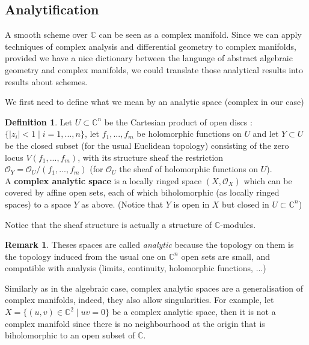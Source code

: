 \documentclass{article}
\theoremstyle{plain}
\theoremstyle{definition}
\newtheorem{definition}[theorem]{Definition}
\newtheorem{remark}{Remark}
\begin{document}
\subsection{Analytification}
\label{analytification}

A smooth scheme over $\mathbb{C}$ can be seen as a complex manifold. 
Since we can apply techniques of complex analysis and differential geometry to complex manifolds, 
provided we have a nice dictionary between the language of abstract algebraic geometry and complex
manifolds, we could translate those analytical results into results about schemes.

\noindent We first need to define what we mean by an analytic space (complex in our case) 

\begin{definition}

    Let $U\subset \mathbb{C}^n$ be the Cartesian product of open discs : $\{|z_i| <1 \mid i=1,...,n\}$,
    let $f_1,...,f_m$ be holomorphic functions on $U$ and
    let $Y\subset U$ be the closed subset (for the usual Euclidean topology) consisting of the zero locus $V(f_1,...,f_m)$, 
    with its structure sheaf the restriction $\mathcal{O}_Y = \mathcal{O}_U/(f_1,...,f_m)$ (for $\mathcal{O}_U$ the sheaf of holomorphic functions on $U$).\\
    A \textbf{complex analytic space} is a locally ringed space $(X,\mathcal{O}_X)$ which can be covered by affine open sets, each of which biholomorphic (as locally ringed spaces) to a space $Y$ as above. (Notice that $Y$ is open in $X$ but closed in $U\subset \mathbb{C}^n$)
\end{definition}

\noindent Notice that the sheaf structure is actually a structure of $\mathbb{C}$-modules.

\begin{remark}
    Theses spaces are called \textit{analytic} because the topology on them is the topology induced from the usual one on $\mathbb{C}^n$ open sets are small, and compatible with analysis (limits, continuity, holomorphic functions, ...)
\end{remark}

\noindent Similarly as in the algebraic case, complex analytic spaces are a generalisation of complex manifolds, indeed, they also allow singularities.
For example, let $X = \{(u,v)\in\mathbb{C}^2 \mid uv= 0\}$ be a complex analytic space, then it is not a complex manifold since there is no neighbourhood at the origin that is biholomorphic to an open subset of $\mathbb{C}$.
\end{document}
